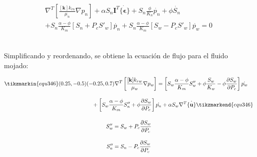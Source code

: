\begin{ceqn} 
\begin{subequations} \label{eq:equ345} 
\begin{gather}
\begin{multlined}
\nabla^T \left[\frac{[\mathbf{k}] k_{rn}}{\mu_{n}}\nabla p_{n}\right]
+ \alpha S_{n}\mathbf{I}^T \dot{\{\mathbf{\epsilon}\}} + S_{n}\frac{\phi}{K_{n}}\dot{p_{n}} + \phi\dot{S_{n}}\\[10pt]
+ S_{n} \frac{\alpha - \phi}{K_m}\left[S_n + P_c S'_w\right]\dot{p_n} 
+ S_{n} \frac{\alpha - \phi}{K_m}\left[S_w - P_c S'_w\right]\dot{p_w} = 0
\end{multlined}
\end{gather}  
\end{subequations} 
\end{ceqn}
\\
Simplificando y reordenando, se obtiene la ecuación de flujo para el fluido mojado:
\\
\begin{ceqn} 
\begin{subequations} \label{eq:equ346} 
\begin{gather}
\begin{multlined}
\tikzmarkin{equ346}(0.25,-0.5)(-0.25,0.7)
\nabla^T \left[\frac{[\mathbf{k}] k_{rw}}{\mu_{w}}\nabla p_w\right] = \left[S_w \frac{\alpha - \phi}{K_m}S''_w + \phi\frac{S_w}{K_w} - \phi\frac{\partial S_w}{\partial P_c}\right]\dot{p_w} \\[10pt]
+ \left[S_w \frac{\alpha - \phi}{K_m}S''_n + \phi\frac{\partial S_w}{\partial P_c}\right]\dot{p_n} +\alpha S_w \nabla^T \dot{\{\mathbf{u}\}} \tikzmarkend{equ346} \label{eq:equ346a}
\end{multlined}\\[12pt]
S''_w = S_w + P_c\frac{\partial S_w}{\partial P_c}  \label{eq:equ346b}\\[10pt]
S''_n = S_n - P_c\frac{\partial S_w}{\partial P_c}  \label{eq:equ346c}
\end{gather}  
\end{subequations} 
\end{ceqn}
